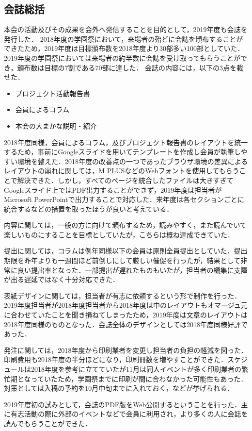 \subsection*{会誌総括}


本会の活動及びその成果を会外へ発信することを目的として，2019年度も会誌を発行した．
2018年度の学園祭において，来場者の殆どに会誌を頒布することができたため，2019年度は目標頒布数を2018年度より30部多い100部としていた．
2019年度の学園祭においては来場者の約半数に会誌を受け取ってもらうことができ，頒布数は目標の7割である70部に達した．
会誌の内容には，以下の3点を載せた．
\begin{itemize}
  \item プロジェクト活動報告書
  \item 会員によるコラム
  \item 本会の大まかな説明・紹介
\end{itemize}

2018年度同様，会員によるコラム，及びプロジェクト報告書のレイアウトを統一するため，事前にGoogleスライドを用いてテンプレートを作成し会員が執筆しやすい環境を整えた．2018年度の改善点の一つであったブラウザ環境の差異によるレイアウトの崩れに関しては，M PLUSなどのWebフォントを使用してもらうことで解決できた．しかし，すべてのページを統合したファイルは大きすぎてGoogleスライド上ではPDF出力することができず，2019年度は担当者がMicrosoft PowerPointで出力することで対応した．来年度は各セクションごとに統合するなどの措置を取ったほうが良いと考えている．

内容に関しては，一般の方に向けて頒布するため，読みやすく，また読んでいて楽しいものにすることを目標としていたが，こちらは概ね達成できていた．

提出に関しては，コラムは例年同様\thirdGrade{}以下の会員は原則全員提出としていた．提出期限を昨年よりも一週間ほど前倒しにして厳しい催促を行ったが，結果として非常に良い提出率となった．一部提出が遅れたものもいたが，担当者の編集に支障が出る遅延ではなく十分対応できた．

表紙デザインに関しては，担当者が有志に依頼するという形で制作を行った．2019年度担当者が2018年度担当者から2018年度は中のレイアウトもオマージュ元に合わせていたことを聞き損ねてしまったため，2019年度は文章のレイアウトは2018年度同様のものとなった．会誌全体のデザインとしては2018年度同様好評であった．

発注に関しては，2018年度から印刷業者を変更し担当者の負担の軽減を図った．印刷費用も2018年度の半分ほどになり，印刷冊数を増やすことができた．スケジュールは2018年度を参考に立てていたが11月は同人イベントが多く印刷業者の繁忙期となっていたため，学園祭までに印刷が間に合わなかった可能性もあった．対策としては入稿の予約を10月中旬までに入れておく，などが挙げられる．

2019年度初の試みとして，会誌のPDF版をWeb公開するということを行った．主に有志活動の際に外部のイベントなどで会員に利用され，より多くの人に会誌を読んでもらうことができた．

